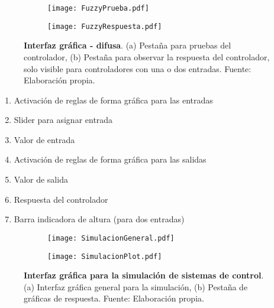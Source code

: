     \begin{figure}[h!]
        \centering
        \begin{subfigure}[t]{\textwidth}
            \centering
            \texttt{[image: FuzzyPrueba.pdf]}
            \caption{}
            \label{fig:FuzzyPrueba}
        \end{subfigure}
        \hfill
        \begin{subfigure}[t]{\textwidth}
            \centering
            \texttt{[image: FuzzyRespuesta.pdf]}
            \caption{}
            \label{fig:FuzzyRespuesta}
        \end{subfigure}
        \caption[Interfaz gráfica - difusa - prueba y respuesta]{\textbf{Interfaz gráfica - difusa}. (a) Pestaña para pruebas del controlador, (b) Pestaña para observar la respuesta del controlador, solo visible para controladores con una o dos entradas. Fuente: Elaboración propia. \label{fig:interfazFuzzyCrear}}
    \end{figure}

    \begin{multicols}{2}
        \begin{enumerate}[leftmargin=20pt]
            \item Activación de reglas de forma gráfica para las entradas
            \item Slider para asignar entrada
            \item Valor de entrada
            \item Activación de reglas de forma gráfica para las salidas
            \item Valor de salida
            \item Respuesta del controlador
            \item Barra indicadora de altura (para dos entradas)
        \end{enumerate}
    \end{multicols}


    \begin{figure}[h!]
        \centering
        \begin{subfigure}[t]{\textwidth}
            \centering
            \texttt{[image: SimulacionGeneral.pdf]}
            \caption{}
            \label{fig:SimulacionGeneral}
        \end{subfigure}
        \hfill
        \begin{subfigure}[t]{\textwidth}
            \centering
            \texttt{[image: SimulacionPlot.pdf]}
            \caption{}
            \label{fig:SimulacionPlot}
        \end{subfigure}
        \caption[Interfaz gráfica para la simulación de sistemas de control]{\textbf{Interfaz gráfica para la simulación de sistemas de control}. (a) Interfaz gráfica general para la simulación, (b) Pestaña de gráficas de respuesta. Fuente: Elaboración propia. \label{fig:SimulacionFront}}
    \end{figure}

